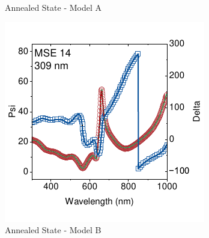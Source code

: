 \begin{figure}[t]
\begin{subfigure}[t]{0.4\textwidth}
        \caption{Annealed State - Model A}
        \label{fig:ellipsometry:static_fits:t23_fixed_thick_50_void}
    \end{subfigure} 
    \begin{subfigure}[t]{0.4\textwidth}
        \centering
        \includegraphics[width=\textwidth]{chapters/ellipsometry/image/t23_fitted_thickness.pdf} %
        \caption{Annealed State - Model B}
        \label{fig:ellipsometry:static_fits:t23_fitted_thick}
    \end{subfigure}
    \hspace{1cm}
    \begin{subfigure}[t]{0.4\textwidth}
        \centering

\end{subfigure}
\end{figure}
